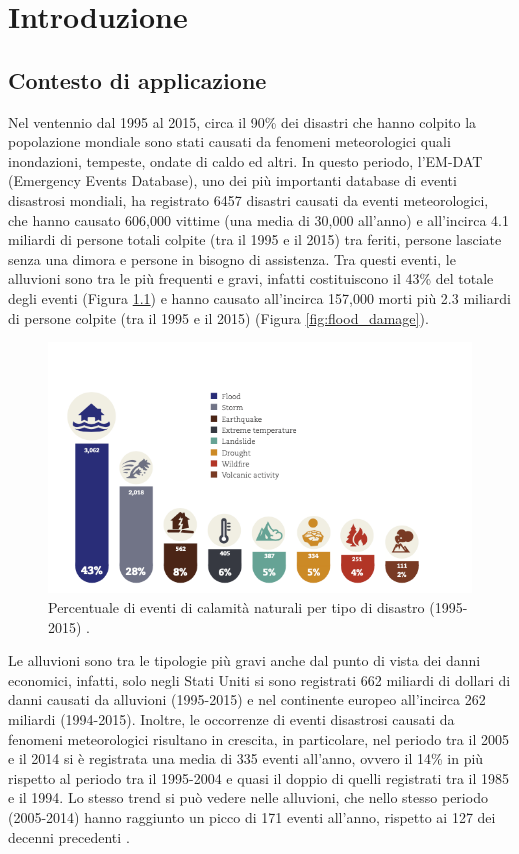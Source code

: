 \chapter{Introduzione}
\section{Contesto di applicazione}
Nel ventennio dal 1995 al 2015, circa il 90\% dei disastri che hanno colpito la popolazione mondiale sono stati causati da fenomeni meteorologici quali inondazioni, tempeste, ondate di caldo ed altri. In questo periodo, l’EM-DAT (Emergency Events Database), uno  dei più importanti database di eventi disastrosi mondiali, ha registrato 6457 disastri causati da eventi meteorologici, che hanno causato 606,000 vittime (una media di 30,000 all’anno) e all’incirca 4.1 miliardi di persone totali colpite (tra il 1995 e il 2015) tra feriti, persone lasciate senza una dimora e persone in bisogno di assistenza.
Tra questi eventi, le alluvioni sono tra le più frequenti e gravi, infatti costituiscono il 43\% del totale degli eventi (Figura \ref{fig:floods}) e hanno causato all’incirca 157,000 morti più 2.3 miliardi di persone colpite (tra il 1995 e il 2015) (Figura \ref{fig:flood_damage}). 
\begin{figure}[h!]
  \includegraphics[scale=0.65]{img/stat1.png}
  \caption{Percentuale di eventi di calamità naturali per tipo di disastro  (1995-2015) \cite{2015human}.}
  \label{fig:floods}
\end{figure}
Le alluvioni sono tra le tipologie più gravi anche dal punto di vista dei danni economici, infatti, solo negli Stati Uniti si sono registrati 662 miliardi di dollari di danni causati da alluvioni (1995-2015) e nel continente europeo all’incirca 262 miliardi (1994-2015). Inoltre, le occorrenze di eventi disastrosi causati da fenomeni meteorologici risultano in crescita, in particolare, nel periodo tra il 2005 e il 2014 si è registrata una media di 335 eventi all’anno, ovvero il 14\% in più rispetto al periodo tra il 1995-2004 e quasi il doppio di quelli registrati tra il 1985 e il 1994. Lo stesso trend si può vedere nelle alluvioni, che nello stesso periodo (2005-2014) hanno raggiunto un picco di 171 eventi all’anno, rispetto ai 127 dei decenni precedenti \cite{2015human}.




